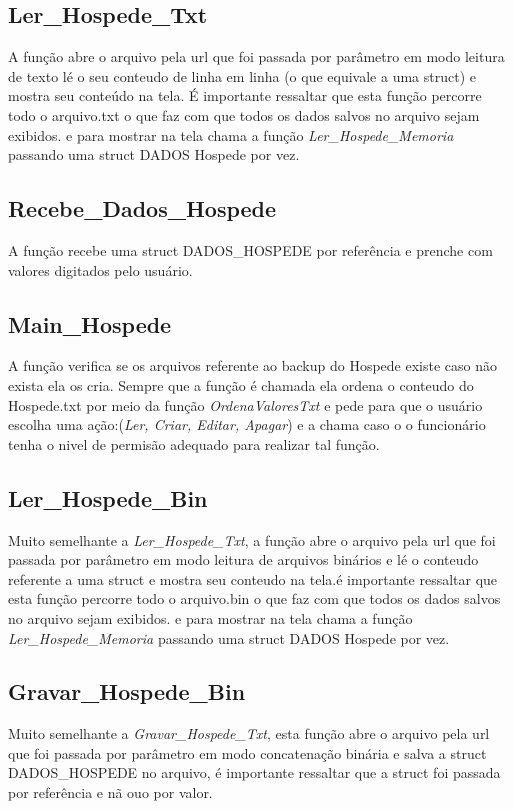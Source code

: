 \documentclass{article}
\begin{document}
\subsection{Ler\_Hospede\_Txt}
	A função abre o arquivo pela url que foi passada por parâmetro em modo leitura de texto lé o seu conteudo de linha em linha (o que equivale a uma struct) e mostra seu conteúdo na tela. É importante ressaltar que esta função percorre todo o arquivo.txt o que faz com que todos os dados salvos no arquivo sejam exibidos. e para mostrar na tela chama a função \textit{Ler\_Hospede\_Memoria} passando uma struct DADOS Hospede  por vez.

\subsection{Recebe\_Dados\_Hospede}
	A função recebe uma struct  DADOS\_HOSPEDE por referência e prenche com valores digitados pelo usuário.

\subsection{Main\_Hospede}
	A função verifica se os arquivos referente ao backup do Hospede existe caso não exista ela os cria. Sempre que a função é chamada ela ordena o conteudo do Hospede.txt por meio da função \textit{OrdenaValoresTxt} e pede para que o usuário escolha uma ação:(\textit{Ler, Criar, Editar, Apagar})  e a chama caso o  o funcionário tenha o nivel de permisão adequado para realizar tal função.

\subsection{Ler\_Hospede\_Bin}
	Muito semelhante a \textit{Ler\_Hospede\_Txt}, a função abre o arquivo pela url que foi passada por parâmetro em modo leitura de arquivos binários e lé o conteudo referente a uma struct e mostra seu conteudo na tela.é importante ressaltar que esta função percorre todo o arquivo.bin o que faz com que todos os dados salvos no arquivo sejam exibidos. e para mostrar na tela chama a função \textit{Ler\_Hospede\_Memoria} passando uma struct DADOS Hospede  por vez.

\subsection{Gravar\_Hospede\_Bin}
	Muito semelhante a \textit{Gravar\_Hospede\_Txt}, esta função abre o arquivo pela url que foi passada por parâmetro em modo concatenação binária e salva a struct DADOS\_HOSPEDE  no arquivo, é importante ressaltar que  a struct foi passada por referência e nã ouo por valor.
\end{document}
